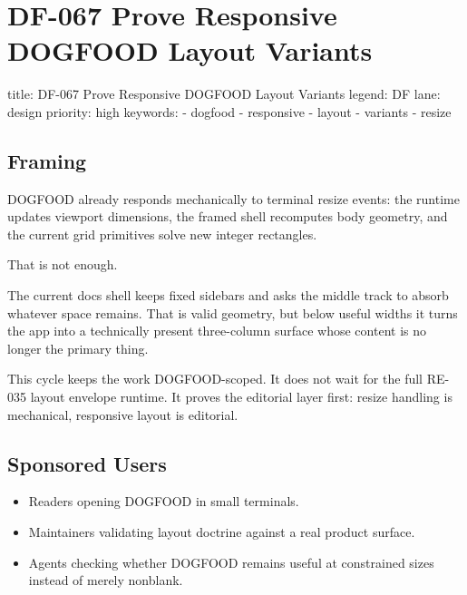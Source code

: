 \chapter{DF-067 Prove Responsive DOGFOOD Layout Variants}\label{record-108}

\smallskip

\begin{RecordMeta}
title: DF-067 Prove Responsive DOGFOOD Layout Variants
legend: DF
lane: design
priority: high
keywords:
  - dogfood
  - responsive
  - layout
  - variants
  - resize

\end{RecordMeta}

\section{Framing}\label{record-108-framing}

DOGFOOD already responds mechanically to terminal resize events: the runtime updates viewport dimensions, the framed shell recomputes body geometry, and the current grid primitives solve new integer rectangles.

That is not enough.

The current docs shell keeps fixed sidebars and asks the middle track to absorb whatever space remains. That is valid geometry, but below useful widths it turns the app into a technically present three-column surface whose content is no longer the primary thing.

This cycle keeps the work DOGFOOD-scoped. It does not wait for the full RE-035 layout envelope runtime. It proves the editorial layer first: resize handling is mechanical, responsive layout is editorial.

\section{Sponsored Users}\label{record-108-sponsored-users}

\begin{itemize}
\tightlist
\item
  Readers opening DOGFOOD in small terminals.
\item
  Maintainers validating layout doctrine against a real product surface.
\item
  Agents checking whether DOGFOOD remains useful at constrained sizes instead of merely nonblank.
\end{itemize}

